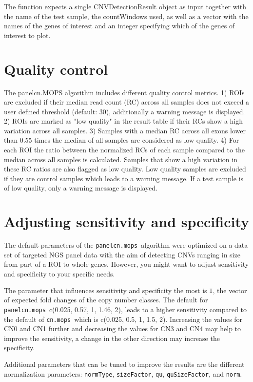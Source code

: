 \documentclass[article]{bioinf}\usepackage[]{graphicx}\usepackage[]{color}
\newcommand{\panelcnmops}{\texttt{panelcn.mops}}
\newcommand{\cnmops}{\texttt{cn.mops}}
\begin{document}
The function expects a single CNVDetectionResult object as input together with 
the name of the test sample, the countWindows used, as well as a vector with 
the names of the genes of interest and an integer specifying which of the 
genes of interest to plot.

\section{Quality control}

The panelcn.MOPS algorithm includes different quality control metrics. 1) ROIs 
are excluded if their median read count (RC) across all samples does not exceed 
a user defined threshold (default: 30), additionally a warning message is 
displayed. 2) ROIs are marked as "low quality" in the result table if their RCs 
show a high variation across all samples. 3) Samples with a median RC across 
all exons lower than 0.55 times the median of all samples are considered as low 
quality. 4) For each ROI the ratio between the normalized RCs of each sample 
compared to the median across all samples is calculated. Samples that show a 
high variation in these RC ratios are also flagged as low quality. Low quality 
samples are excluded if they are control samples which leads to a warning 
message. If a test sample is of low quality, only a warning message is 
displayed. 

\section{Adjusting sensitivity and specificity}
The default parameters of the \panelcnmops\ algorithm were optimized on a data 
set of targeted NGS panel data with the aim of detecting CNVs ranging in size 
from part of a ROI to whole genes. However, you might want to adjust 
sensitivity and specificity to your specific needs.

The parameter that influences sensitivity and specificity the most is {\tt I}, 
the vector of expected fold changes of the copy number classes. The default for 
\panelcnmops\, c(0.025, 0.57, 1, 1.46, 2), leads to a higher sensitivity 
compared to the default of \cnmops\ which is c(0.025, 0.5, 1, 1.5, 2). 
Increasing the values for CN0 and CN1 further and decreasing the values for 
CN3 and CN4 may help to improve the sensitivity, a change in the other 
direction may increase the specificity.

Additional parameters that can be tuned to improve the results are the 
different normalization parameters: {\tt normType}, {\tt sizeFactor}, 
{\tt qu}, {\tt quSizeFactor}, and {\tt norm}.
\end{document}
